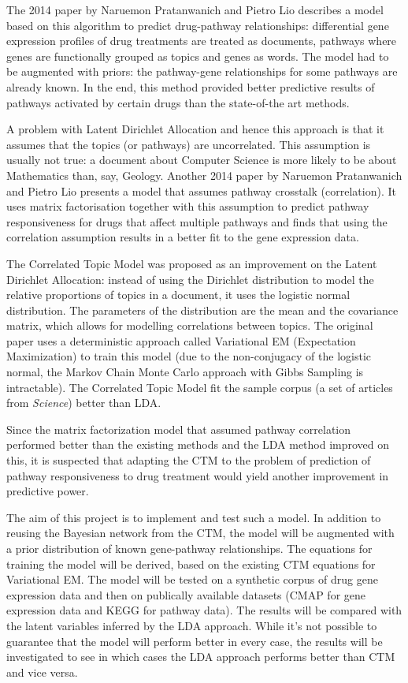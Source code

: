 \documentclass[12pt,a4]{article}
\begin{document}
The 2014 paper\cite{Pratanwanich2014} by Naruemon Pratanwanich and Pietro Lio describes a model based on this algorithm to predict drug-pathway relationships: differential gene expression profiles of drug treatments are treated as documents, pathways where genes are functionally grouped as topics and genes as words. The model had to be augmented with priors: the pathway-gene relationships for some pathways are already known. In the end, this method provided better predictive results of pathways activated by certain drugs than the state-of-the art methods.

A problem with Latent Dirichlet Allocation and hence this approach is that it assumes that the topics (or pathways) are uncorrelated. This assumption is usually not true: a document about Computer Science is more likely to be about Mathematics than, say, Geology. Another 2014 paper\cite{C4MB00014E} by Naruemon Pratanwanich and Pietro Lio presents a model that assumes pathway crosstalk (correlation). It uses matrix factorisation together with this assumption to predict pathway responsiveness for drugs that affect multiple pathways and finds that using the correlation assumption results in a better fit to the gene expression data.

The Correlated Topic Model\cite{2007} was proposed as an improvement on the Latent Dirichlet Allocation: instead of using the Dirichlet distribution to model the relative proportions of topics in a document, it uses the logistic normal distribution. The parameters of the distribution are the mean and the covariance matrix, which allows for modelling correlations between topics. The original paper\cite{2007} uses a deterministic approach called Variational EM (Expectation Maximization) to train this model (due to the non-conjugacy of the logistic normal, the Markov Chain Monte Carlo approach with Gibbs Sampling is intractable). The Correlated Topic Model fit the sample corpus (a set of articles from \textit{Science}) better than LDA\cite{2007}.

Since the matrix factorization model that assumed pathway correlation\cite{C4MB00014E} performed better than the existing methods and the LDA method\cite{Pratanwanich2014} improved on this, it is suspected that adapting the CTM to the problem of prediction of pathway responsiveness to drug treatment would yield another improvement in predictive power.

The aim of this project is to implement and test such a model. In addition to reusing the Bayesian network from the CTM, the model will be augmented with a prior distribution of known gene-pathway relationships. The equations for training the model will be derived, based on the existing CTM equations for Variational EM\cite{2007}. The model will be tested on a synthetic corpus of drug gene expression data and then on publically available datasets (CMAP\cite{CMap} for gene expression data and KEGG\cite{KEGG} for pathway data). The results will be compared with the latent variables inferred by the LDA approach. While it's not possible to guarantee that the model will perform better in every case, the results will be investigated to see in which cases the LDA approach performs better than CTM and vice versa.
\end{document}

